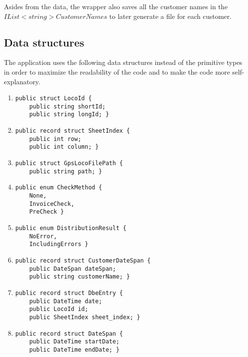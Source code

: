 \documentclass[11pt]{article}
\begin{document}
Asides from the data, the wrapper also saves all the customer names in the \begin{math}IList<string>CustomerNames\end{math} to later generate a file for each customer.

\pagebreak

\subsection{Data structures}
\label{sec:DataStructures}

The application uses the following data structures instead of the primitive types in order to maximize the readability of the code and to make the code more self-explanatory.

\begin{enumerate}
\item[] \begin{verbatim}
public struct LocoId {
    public string shortId;
    public string longId; }
\end{verbatim}
\item[] \begin{verbatim}
public record struct SheetIndex {
    public int row;
    public int column; }
\end{verbatim}
\item[] \begin{verbatim}
public struct GpsLocoFilePath {
    public string path; }
\end{verbatim}
\item[] \begin{verbatim}
public enum CheckMethod {
    None,
    InvoiceCheck,
    PreCheck }
\end{verbatim}
\item[] \begin{verbatim}
public enum DistributionResult {
    NoError,
    IncludingErrors }
\end{verbatim}
\item[] \begin{verbatim}
public record struct CustomerDateSpan {
    public DateSpan dateSpan;
    public string customerName; }
\end{verbatim}
\item[] \begin{verbatim}
public record struct DbeEntry {
    public DateTime date;
    public LocoId id;
    public SheetIndex sheet_index; }
\end{verbatim}
\item[] \begin{verbatim}
public record struct DateSpan {
    public DateTime startDate;
    public DateTime endDate; }
\end{verbatim}
\end{enumerate}
\end{document}

